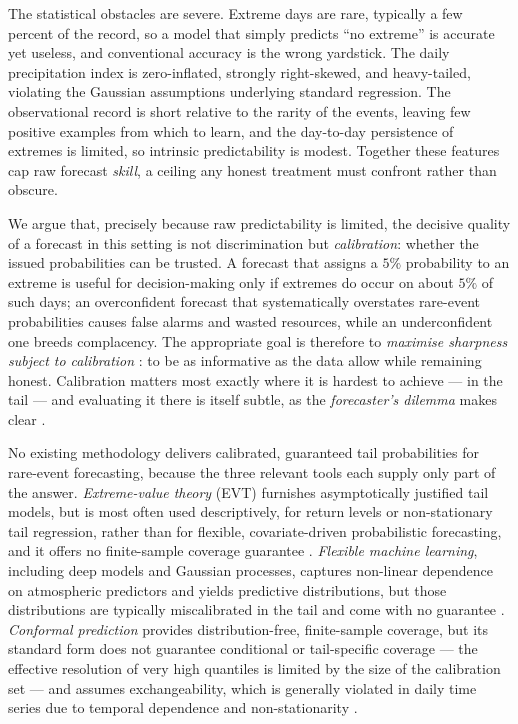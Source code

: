 \documentclass[11pt,a4paper]{article}
\begin{document}
The statistical obstacles are severe. Extreme days are rare, typically
a few percent of the record, so a model that simply predicts ``no extreme'' is
accurate yet useless, and conventional accuracy is the wrong yardstick. The
daily precipitation index is zero-inflated, strongly right-skewed, and
heavy-tailed, violating the Gaussian assumptions underlying standard regression.
The observational record is short relative to the rarity of the events, leaving
few positive examples from which to learn, and the day-to-day persistence of
extremes is limited, so intrinsic predictability is modest. Together these
features cap raw forecast \emph{skill}, a ceiling any honest treatment must
confront rather than obscure.

We argue that, precisely because raw predictability is limited, the decisive
quality of a forecast in this setting is not discrimination but
\emph{calibration}: whether the issued probabilities can be trusted. A forecast
that assigns a $5\%$ probability to an extreme is useful for decision-making
only if extremes do occur on about $5\%$ of such days; an overconfident forecast
that systematically overstates rare-event probabilities causes false alarms and
wasted resources, while an underconfident one breeds complacency. The
appropriate goal is therefore to \emph{maximise sharpness subject to
calibration} \citep{gneiting2007sharpness}: to be as informative as the data
allow while remaining honest. Calibration matters most exactly where it is
hardest to achieve --- in the tail --- and evaluating it there is itself subtle,
as the \emph{forecaster's dilemma} makes clear \citep{lerch2017dilemma}.

No existing methodology delivers calibrated, guaranteed tail probabilities for
rare-event forecasting, because the three relevant tools each supply only part
of the answer. \emph{Extreme-value theory} (EVT) furnishes asymptotically
justified tail models, but is most often used descriptively, for return
levels or non-stationary tail regression, rather than for flexible,
covariate-driven probabilistic forecasting, and it offers no finite-sample
coverage guarantee \citep{coles2001evt,davison1990}. \emph{Flexible machine
learning}, including deep models and Gaussian processes, captures non-linear
dependence on atmospheric predictors and yields predictive distributions, but
those distributions are typically miscalibrated in the tail and come with no
guarantee \citep{galib2022deepextrema,lakshminarayanan2017}. \emph{Conformal
prediction} provides distribution-free, finite-sample coverage, but its standard
form does not guarantee conditional or tail-specific coverage --- the effective
resolution of very high quantiles is limited by the size of the calibration set
--- and assumes exchangeability, which is generally violated in daily time series
due to temporal dependence and non-stationarity
\citep{gibbs2021adaptive,pasche2025extreme}.
\end{document}
